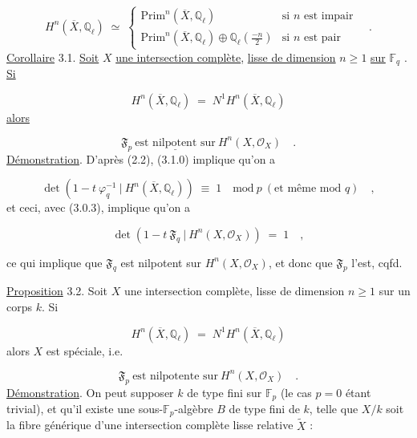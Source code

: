 \begin{equation}\tag{3.0.7}
H^n(\overline{X},\mathbb{Q}_\ell) \;\simeq\; \begin{cases} \mathrm{Prim}^n(\overline{X},\mathbb{Q}_\ell) & \text{si } n \text{ est impair} \\[2mm] \mathrm{Prim}^n(\overline{X},\mathbb{Q}_\ell) \oplus \mathbb{Q}_\ell\!\left(\frac{-n}{2}\right) & \text{si } n \text{ est pair} \end{cases} \quad .
\end{equation}
\underline{Corollaire} 3.1. \underline{Soit} $X$ \underline{une intersection complète}, \underline{lisse de dimension} $n \geq 1$ \underline{sur} $\mathbb{F}_q$ . \underline{Si}

\begin{equation}\tag{3.1.0}
H^n(\overline{X},\mathbb{Q}_\ell) \;=\; N^1H^n(\overline{X},\mathbb{Q}_\ell)
\end{equation}
\underline{alors}

\begin{equation}\tag{3.1.1}
\mathfrak{F}_p\ \underline{\text{est nilpotent sur}}\ H^n(X,\mathcal{O}_X) \quad .
\end{equation}
\underline{Démonstration}. D'après (2.2), (3.1.0) implique qu'on a

\begin{equation}\tag{3.1.2}
\det(1-t\ \varphi_q^{-1}\ |\ H^n(\overline{X},\mathbb{Q}_\ell)) \;\equiv\; 1 \quad \mathrm{mod}\ p\ (\text{et même mod } q) \quad ,
\end{equation}
et ceci, avec (3.0.3), implique qu'on a

\begin{equation}\tag{3.1.3}
\det(1-t\ \mathfrak{F}_q\ |\ H^n(X,\mathcal{O}_X)) \;=\; 1 \quad , 
\end{equation}


 ce qui implique que $\mathfrak{F}_q$ est nilpotent sur $H^n(X,\mathcal{O}_X)$, et donc que $\mathfrak{F}_p$ l'est, cqfd.

\underline{Proposition} 3.2. Soit $X$ une intersection complète, lisse de dimension $n \geq 1$ sur un corps $k$. Si

\begin{equation}\tag{3.2.1}
H^n(\overline{X},\mathbb{Q}_\ell) \;=\; N^1H^n(\overline{X},\mathbb{Q}_\ell)
\end{equation}
alors $X$ est spéciale, i.e.

\begin{equation}\tag{3.2.2}
\mathfrak{F}_p\ \text{est nilpotente sur}\ H^n(X,\mathcal{O}_X) \quad .
\end{equation}
\underline{Démonstration}. On peut supposer $k$ de type fini sur $\mathbb{F}_p$ (le cas $p = 0$ étant trivial), et qu'il existe une sous-$\mathbb{F}_p$-algèbre $B$ de type fini de $k$, telle que $X/k$ soit la fibre générique d'une intersection complète lisse relative $\widetilde{X}$ :


